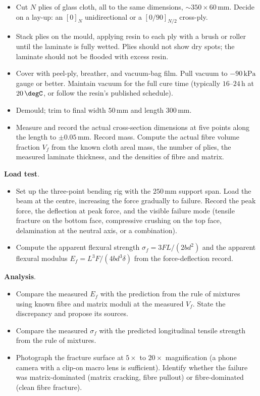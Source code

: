 \begin{project}
\begin{itemize}[leftmargin=*]
\item Cut $N$ plies of glass cloth, all to the same dimensions,
  $\sim 350 \times 60\,\text{mm}$. Decide on a lay-up: an
  $[0]_N$ unidirectional or a $[0/90]_{N/2}$ cross-ply.
\item Stack plies on the mould, applying resin to each ply with a
  brush or roller until the laminate is fully wetted. Plies should
  not show dry spots; the laminate should not be flooded with excess
  resin.
\item Cover with peel-ply, breather, and vacuum-bag film. Pull vacuum
  to $-90\,\text{kPa}$ gauge or better. Maintain vacuum for the full
  cure time (typically $16$--$24\,\text{h}$ at $20\,\degC$, or follow
  the resin's published schedule).
\item Demould; trim to final width $50\,\text{mm}$ and length
  $300\,\text{mm}$.
\item Measure and record the actual cross-section dimensions at five
  points along the length to $\pm 0.05\,\text{mm}$. Record mass.
  Compute the actual fibre volume fraction $V_f$ from the known
  cloth areal mass, the number of plies, the measured laminate
  thickness, and the densities of fibre and matrix.
\end{itemize}

\textbf{Load test}.

\begin{itemize}[leftmargin=*]
\item Set up the three-point bending rig with the $250\,\text{mm}$
  support span. Load the beam at the centre, increasing the force
  gradually to failure. Record the peak force, the deflection at
  peak force, and the visible failure mode (tensile fracture on the
  bottom face, compressive crushing on the top face, delamination at
  the neutral axis, or a combination).
\item Compute the apparent flexural strength
  $\sigma_f = 3 F L / (2 b d^2)$ and the apparent flexural modulus
  $E_f = L^3 F / (4 b d^3 \delta)$ from the force-deflection record.
\end{itemize}

\textbf{Analysis}.

\begin{itemize}[leftmargin=*]
\item Compare the measured $E_f$ with the prediction from the rule of
  mixtures using known fibre and matrix moduli at the measured $V_f$.
  State the discrepancy and propose its sources.
\item Compare the measured $\sigma_f$ with the predicted longitudinal
  tensile strength from the rule of mixtures.
\item Photograph the fracture surface at $5\times$ to $20\times$
  magnification (a phone camera with a clip-on macro lens is
  sufficient). Identify whether the failure was matrix-dominated
  (matrix cracking, fibre pullout) or fibre-dominated (clean fibre
  fracture).
\end{itemize}


\end{project}
